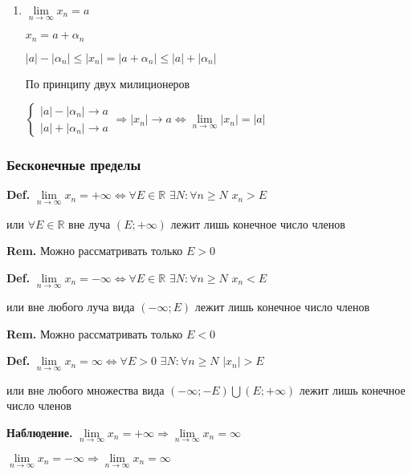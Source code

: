\documentclass[14pt, letter paper]{article}
\begin{document}
\begin{enumerate}
    \item $\lim\limits_{n \rightarrow \infty}{x_n} = a$

    $x_n = a + \alpha_n$

    $|a| - |\alpha_n| \leq |x_n| = |a + \alpha_n| \leq |a| + |\alpha_n|$

    По принципу двух милиционеров

    $\begin{cases}
        |a| - |\alpha_n| \rightarrow a \\
        |a| + |\alpha_n| \rightarrow a
    \end{cases} \Rightarrow |x_n| \rightarrow a \Leftrightarrow \lim\limits_{n \rightarrow \infty}{|x_n|} = |a|$
\end{enumerate}

\begin{center}
    \subsubsection*{Бесконечные пределы}
\end{center}

\textbf{Def.} $\lim\limits_{n \rightarrow \infty}{x_n} = +\infty \Leftrightarrow \forall E \in \mathds{R}$ $\exists N : \forall n \geq N$ $x_n > E$

или $\forall E \in \mathds{R}$ вне луча $(E;+ \infty)$ лежит лишь конечное число членов

\textbf{Rem.} Можно рассматривать только $E > 0$

\textbf{Def.} $\lim\limits_{n \rightarrow \infty}{x_n} = - \infty \Leftrightarrow \forall E \in \mathds{R}$ $\exists N : \forall n \geq N$ $x_n < E$

или вне любого луча вида $(-\infty; E)$ лежит лишь конечное число членов

\textbf{Rem.} Можно рассматривать только $E < 0$

\textbf{Def.} $\lim\limits_{n \rightarrow \infty}{x_n} = \infty \Leftrightarrow \forall E > 0$ $\exists N : \forall n \geq N$ $|x_n| > E$

или вне любого множества вида $(-\infty; -E) \bigcup (E; +\infty)$ лежит лишь конечное число членов

\textbf{Наблюдение.} $\lim\limits_{n \rightarrow \infty}{x_n} = + \infty \Rightarrow \lim\limits_{n \rightarrow \infty}{x_n} = \infty$

$\lim\limits_{n \rightarrow \infty}{x_n} = - \infty \Rightarrow \lim\limits_{n \rightarrow \infty}{x_n} = \infty$
\end{document}
